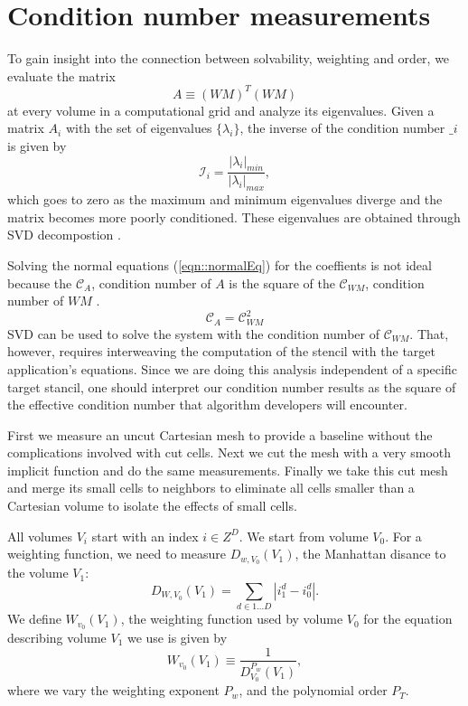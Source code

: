 \documentclass{article}
\newcommand{\cali}{\mathcal{I}}
\newcommand{\calc}{\mathcal{C}}
\begin{document}
\section{Condition number measurements}

To gain insight into the connection between solvability, weighting and
order, we evaluate the matrix
\begin{equation}
A \equiv (WM)^T(WM)
\label{eqn::normalEq}
\end{equation}
at every volume in a computational grid and analyze its
eigenvalues.   Given a matrix $A_i$ with the set of eigenvalues
$\{ \lambda_{i}\}$, the inverse of the condition number $\_i$ is given by
\begin{equation*}
  \cali_i = \frac{|\lambda_i|_{min}}{|\lambda_i|_{max}},
\end{equation*}
which goes to zero as the maximum and minimum eigenvalues diverge and
the matrix becomes more poorly conditioned.   These eigenvalues are
obtained through  SVD decompostion \footnotemark[7].

Solving the normal equations (\ref{eqn::normalEq}) for the
coeffients is not ideal because the $\calc_A$, condition number of $A$ is the
square of the $\calc_{WM}$,  condition number of $WM$  \cite{BigCheese}.  
\begin{equation}
  \calc_A = \calc^2_{WM}
\end{equation}  
SVD can be used to solve the system with the condition number of
$\calc_{WM}$.  That, however, requires interweaving the computation of
the stencil with the target application's equations.  Since we are
doing this analysis independent of a specific target stancil, one should
interpret our condition number results as the square of the effective
condition number that algorithm developers will encounter.

First we  measure   an uncut Cartesian mesh to
provide a baseline without the complications involved with cut cells.
Next we cut the mesh with a very smooth implicit function and do the
same measurements.   Finally we take this cut mesh and merge its small
cells to neighbors to eliminate all cells smaller than a Cartesian
volume to isolate the effects of small cells.

All volumes $V_i$ start with an  index $i \in Z^D$.
We start from volume $V_0$.   For 
a weighting function, we need to measure $D_{w, V_0}(V_1)$,
the Manhattan disance to the volume $V_1$:
\begin{equation}
  D_{W, V_0}(V_1) = \sum\limits_{d \in {1...D}} |i_1^d - i_0^d|.
\label{eqn::uptownFunk}
\end{equation}
We define $W_{v_0}(V_1)$, the weighting function used by volume $V_0$ for the
equation describing  volume $V_1$ we use is given by
\begin{equation}
  W_{v_0}(V_1)  \equiv \frac{1}{D^{P_w}_{V_0}(V_1)},
\label{eqn::weightFunk}  
\end{equation}
where we vary the weighting exponent $P_w$, and the 
polynomial order $P_T$.
\end{document}
